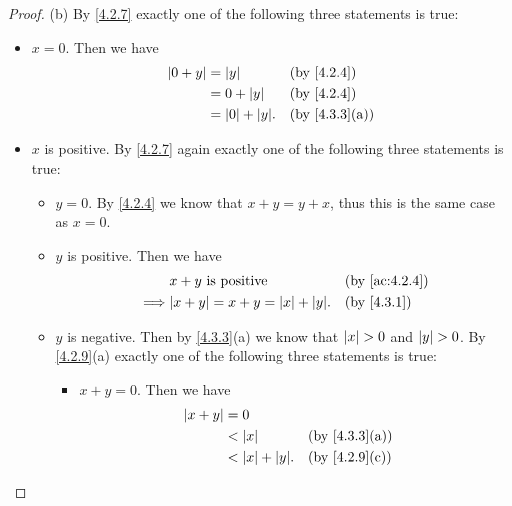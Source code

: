 \begin{proof}{(b)}
  By \cref{4.2.7} exactly one of the following three statements is true:
  \begin{itemize}
    \item \(x = 0\).
          Then we have
          \begin{align*}
            \abs{0 + y} & = \abs{y}            &  & \by{4.2.4}                  \\
                        & = 0 + \abs{y}        &  & \by{4.2.4}                  \\
                        & = \abs{0} + \abs{y}. &  & \text{(by \cref{4.3.3}(a))}
          \end{align*}
    \item \(x\) is positive.
          By \cref{4.2.7} again exactly one of the following three statements is true:
          \begin{itemize}
            \item \(y = 0\).
                  By \cref{4.2.4} we know that \(x + y = y + x\), thus this is the same case as \(x = 0\).
            \item \(y\) is positive.
                  Then we have
                  \begin{align*}
                             & x + y \text{ is positive}                &  & \text{(by \cref{ac:4.2.4})} \\
                    \implies & \abs{x + y} = x + y = \abs{x} + \abs{y}. &  & \by{4.3.1}
                  \end{align*}
            \item \(y\) is negative.
                  Then by \cref{4.3.3}(a) we know that \(\left\lvert x\right\rvert > 0\) and \(\left\lvert y\right\rvert > 0\).
                  By \cref{4.2.9}(a) exactly one of the following three statements is true:
                  \begin{itemize}
                    \item \(x + y = 0\).
                          Then we have
                          \begin{align*}
                            \abs{x + y} & = 0                                                   \\
                                        & < \abs{x}            &  & \text{(by \cref{4.3.3}(a))} \\
                                        & < \abs{x} + \abs{y}. &  & \text{(by \cref{4.2.9}(c))}
                          \end{align*}

\end{itemize}
\end{itemize}
\end{itemize}
\end{proof}
